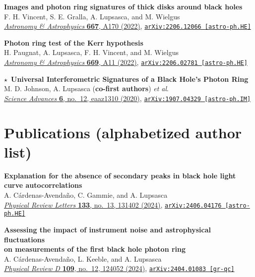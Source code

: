 \documentclass[margin,line]{resume}
\begin{document}
\begin{resume}
\textbf{Images and photon ring signatures of thick disks around black holes} \\
F. H. Vincent, S. E. Gralla, A. Lupsasca, and M. Wielgus \\
\href{https://doi.org/10.1051/0004-6361/202244339}{\textit{Astronomy \& Astrophysics} \textbf{667}, A170 (2022)}, \texttt{\href{https://arxiv.org/abs/2206.12066}{arXiv:2206.12066 [astro-ph.HE]}}

\textbf{Photon ring test of the Kerr hypothesis} \\
H. Paugnat, A. Lupsasca, F. H. Vincent, and M. Wielgus \\
\href{https://doi.org/10.1051/0004-6361/202244216}{\textit{Astronomy \& Astrophysics} \textbf{669}, A11 (2022)}, \texttt{\href{https://arxiv.org/abs/2206.02781}{arXiv:2206.02781 [astro-ph.HE]}}

\hspace{-9pt}$\star$\ \textbf{Universal Interferometric Signatures of a Black Hole's Photon Ring} \\
M. D. Johnson, A. Lupsasca (\textbf{co-first authors}) \textit{et al}. \\
\href{https://doi.org/10.1126/sciadv.aaz1310}{\textit{Science Advances} \textbf{6}, no.~12, eaaz1310 (2020)}, \texttt{\href{https://arxiv.org/abs/arXiv:1907.04329}{arXiv:1907.04329 [astro-ph.IM]}}

\section{\mysidestyle Publications (alphabetized author list)}

\textbf{Explanation for the absence of secondary peaks in black hole light curve autocorrelations} \\
A. C\'ardenas-Avenda\~no, C. Gammie, and A. Lupsasca \\
\href{https://doi.org/10.1103/PhysRevLett.133.131402}{\textit{Physical Review Letters} \textbf{133}, no.~13, 131402 (2024)}, \texttt{\href{https://arxiv.org/abs/2406.04176}{arXiv:2406.04176 [astro-ph.HE]}}

\textbf{Assessing the impact of instrument noise and astrophysical fluctuations}\\
\textbf{on measurements of the first black hole photon ring} \\
A. C\'ardenas-Avenda\~no, L. Keeble, and A. Lupsasca \\
\href{https://doi.org/10.1103/PhysRevD.109.124052}{\textit{Physical Review D} \textbf{109}, no.~12, 124052 (2024)}, \texttt{\href{https://arxiv.org/abs/2404.01083}{arXiv:2404.01083 [gr-qc]}}


\end{resume}
\end{document}
